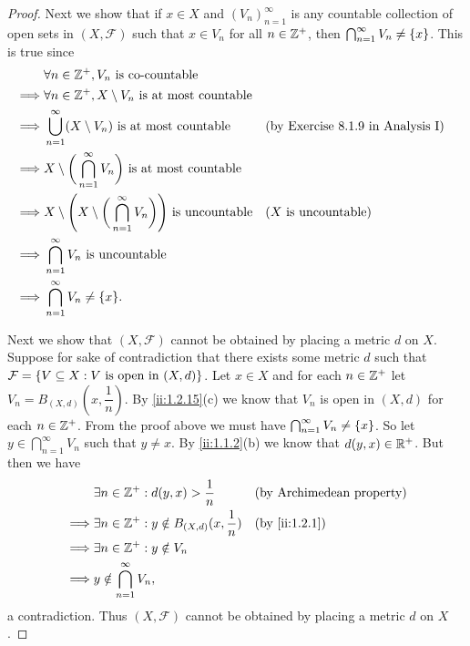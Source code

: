 \begin{proof}
  Next we show that if \(x \in X\) and \((V_n)_{n = 1}^\infty\) is any countable collection of open sets in \((X, \mathcal{F})\) such that \(x \in V_n\) for all \(n \in \mathbb{Z}^+\), then \(\bigcap_{n = 1}^\infty V_n \neq \left\lbrace x\right\rbrace\).
  This is true since
  \begin{align*}
             & \forall n \in \Z^+, V_n \text{ is co-countable}                                                                                                 \\
    \implies & \forall n \in \Z^+, X \setminus V_n \text{ is at most countable}                                                                                \\
    \implies & \bigcup_{n = 1}^\infty (X \setminus V_n) \text{ is at most countable}                             &  & \text{(by Exercise 8.1.9 in Analysis I)} \\
    \implies & X \setminus \bigg(\bigcap_{n = 1}^\infty V_n\bigg) \text{ is at most countable}                                                                 \\
    \implies & X \setminus \Bigg(X \setminus \bigg(\bigcap_{n = 1}^\infty V_n\bigg)\Bigg) \text{ is uncountable} &  & \text{(\(X\) is uncountable)}            \\
    \implies & \bigcap_{n = 1}^\infty V_n \text{ is uncountable}                                                                                               \\
    \implies & \bigcap_{n = 1}^\infty V_n \neq \set{x}.
  \end{align*}

  Next we show that \((X, \mathcal{F})\) cannot be obtained by placing a metric \(d\) on \(X\).
  Suppose for sake of contradiction that there exists some metric \(d\) such that \(\mathcal{F} = \left\lbrace V \subseteq X : V \text{ is open in } (X, d)\right\rbrace\).
  Let \(x \in X\) and for each \(n \in \mathbb{Z}^+\) let \(V_n = B_{(X, d)}(x, \dfrac{1}{n})\).
  By \cref{ii:1.2.15}(c) we know that \(V_n\) is open in \((X, d)\) for each \(n \in \mathbb{Z}^+\).
  From the proof above we must have \(\bigcap_{n = 1}^\infty V_n \neq \left\lbrace x\right\rbrace\).
  So let \(y \in \bigcap_{n = 1}^\infty V_n\) such that \(y \neq x\).
  By \cref{ii:1.1.2}(b) we know that \(d(y, x) \in \mathbb{R}^+\).
  But then we have
  \begin{align*}
             & \exists n \in \Z^+ : d(y, x) > \dfrac{1}{n}               &  & \text{(by Archimedean property)} \\
    \implies & \exists n \in \Z^+ : y \notin B_{(X, d)}(x, \dfrac{1}{n}) &  & \by{ii:1.2.1}                    \\
    \implies & \exists n \in \Z^+ : y \notin V_n                                                               \\
    \implies & y \notin \bigcap_{n = 1}^\infty V_n,
  \end{align*}
  a contradiction.
  Thus \((X, \mathcal{F})\) cannot be obtained by placing a metric \(d\) on \(X\).


\end{proof}
